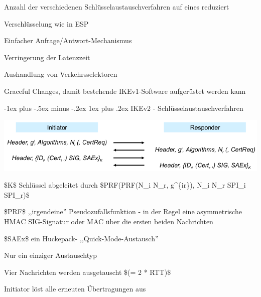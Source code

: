 \documentclass[a4paper]{article}
\makeatletter
\renewcommand{\subsubsection}{\@startsection{subsubsection}{3}{0mm}%
 {-1ex plus -.5ex minus -.2ex}%
 {1ex plus .2ex}%
 {\normalfont\small\bfseries}}
\makeatother
\begin{document}
\begin{multicols}{3}
\begin{itemize*}
\begin{itemize*}
                  \begin{itemize*}
                        \item Anzahl der verschiedenen Schlüsselaustauschverfahren auf eines reduziert
                        \item Verschlüsselung wie in ESP
                        \item Einfacher Anfrage/Antwort-Mechanismus
                  \end{itemize*}
                  \item
                  Verringerung der Latenzzeit
                  \item
                  Aushandlung von Verkehrsselektoren
                  \item
                  Graceful Changes, damit bestehende IKEv1-Software aufgerüstet werden
                  kann
            \end{itemize*}


            \subsubsection{IKEv2 -
                  Schlüsselaustauschverfahren}

            \begin{itemize*}
                  \item \includegraphics[width=\linewidth]{Assets/NetworkSecurity-IKEv2-exchange-procedure.png}
                  \begin{itemize*}
                        \item \$K\$ Schlüssel abgeleitet durch \$PRF(PRF(N\_i \textbar\textbar{} N\_r, g\^{}\{ir\}), N\_i \textbar\textbar{} N\_r \textbar\textbar{} SPI\_i \textbar\textbar{} SPI\_r)\$
                        \item \$PRF\$ ,,irgendeine'' Pseudozufallsfunktion - in der Regel eine asymmetrische HMAC SIG-Signatur oder MAC über die ersten beiden Nachrichten
                        \item \$SAEx\$ ein Huckepack- ,,Quick-Mode-Austausch''
                  \end{itemize*}
                  \item Nur ein einziger Austauschtyp
                  \item Vier Nachrichten werden ausgetauscht \$(= 2 * RTT)\$
                  \item Initiator löst alle erneuten Übertragungen aus
            \end{itemize*}


\end{itemize*}
\end{multicols}
\end{document}

